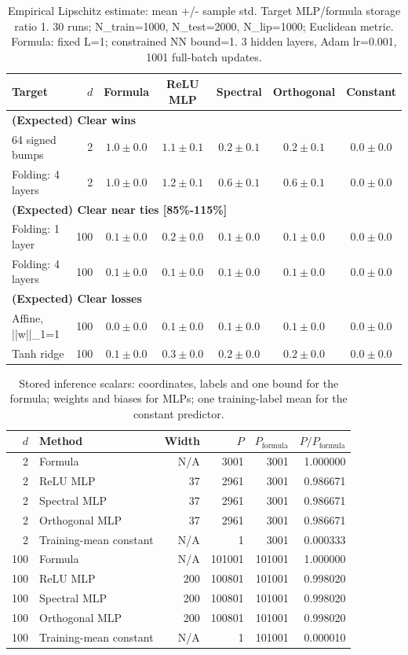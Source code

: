 \documentclass{article}
\begin{document}
\begin{table}[t]
\centering
\scriptsize
\setlength{\tabcolsep}{3pt}
\caption{Empirical Lipschitz estimate: mean +/- sample std. Target MLP/formula storage ratio 1. 30 runs; N\_train=1000, N\_test=2000, N\_lip=1000; Euclidean metric. Formula: fixed L=1; constrained NN bound=1. 3 hidden layers, Adam lr=0.001, 1001 full-batch updates.}
\begin{tabular}{lrccccc}
\hline
Target & $d$ & Formula & ReLU MLP & Spectral & Orthogonal & Constant \\
\hline
\multicolumn{7}{l}{\textbf{(Expected) Clear wins}} \\
64 signed bumps & 2 & $1.0\pm 0.0$ & $1.1\pm 0.1$ & $0.2\pm 0.1$ & $0.2\pm 0.1$ & $0.0\pm 0.0$ \\
Folding: 4 layers & 2 & $1.0\pm 0.0$ & $1.2\pm 0.1$ & $0.6\pm 0.1$ & $0.6\pm 0.1$ & $0.0\pm 0.0$ \\
\hline
\multicolumn{7}{l}{\textbf{(Expected) Clear near ties [85\%-115\%]}} \\
Folding: 1 layer & 100 & $0.1\pm 0.0$ & $0.2\pm 0.0$ & $0.1\pm 0.0$ & $0.1\pm 0.0$ & $0.0\pm 0.0$ \\
Folding: 4 layers & 100 & $0.1\pm 0.0$ & $0.1\pm 0.0$ & $0.1\pm 0.0$ & $0.1\pm 0.0$ & $0.0\pm 0.0$ \\
\hline
\multicolumn{7}{l}{\textbf{(Expected) Clear losses}} \\
Affine, ||w||\_1=1 & 100 & $0.0\pm 0.0$ & $0.1\pm 0.0$ & $0.1\pm 0.0$ & $0.1\pm 0.0$ & $0.0\pm 0.0$ \\
Tanh ridge & 100 & $0.1\pm 0.0$ & $0.3\pm 0.0$ & $0.2\pm 0.0$ & $0.2\pm 0.0$ & $0.0\pm 0.0$ \\
\hline
\end{tabular}
\end{table}
\clearpage
\begin{table}[t]
\centering
\scriptsize
\caption{Stored inference scalars: coordinates, labels and one bound for the formula; weights and biases for MLPs; one training-label mean for the constant predictor.}
\begin{tabular}{rlrrrr}
\hline
$d$ & Method & Width & $P$ & $P_{\mathrm{formula}}$ & $P/P_{\mathrm{formula}}$ \\
\hline
2 & Formula & N/A & 3001 & 3001 & 1.000000 \\
2 & ReLU MLP & 37 & 2961 & 3001 & 0.986671 \\
2 & Spectral MLP & 37 & 2961 & 3001 & 0.986671 \\
2 & Orthogonal MLP & 37 & 2961 & 3001 & 0.986671 \\
2 & Training-mean constant & N/A & 1 & 3001 & 0.000333 \\
100 & Formula & N/A & 101001 & 101001 & 1.000000 \\
100 & ReLU MLP & 200 & 100801 & 101001 & 0.998020 \\
100 & Spectral MLP & 200 & 100801 & 101001 & 0.998020 \\
100 & Orthogonal MLP & 200 & 100801 & 101001 & 0.998020 \\
100 & Training-mean constant & N/A & 1 & 101001 & 0.000010 \\
\hline
\end{tabular}
\end{table}
\end{document}
